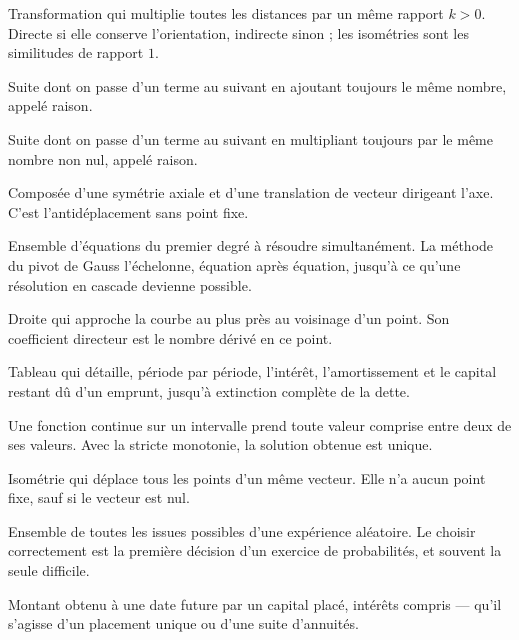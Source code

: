 Transformation qui multiplie toutes les distances par un même rapport $k>0$.
Directe si elle conserve l'orientation, indirecte sinon ; les isométries sont
les similitudes de rapport $1$.

Suite dont on passe d'un terme au suivant en ajoutant toujours le même nombre,
appelé raison.

Suite dont on passe d'un terme au suivant en multipliant toujours par le même
nombre non nul, appelé raison.

Composée d'une symétrie axiale et d'une translation de vecteur dirigeant
l'axe. C'est l'antidéplacement sans point fixe.

Ensemble d'équations du premier degré à résoudre simultanément. La méthode
du pivot de Gauss l'échelonne, équation après équation, jusqu'à ce qu'une
résolution en cascade devienne possible.


Droite qui approche la courbe au plus près au voisinage d'un point. Son
coefficient directeur est le nombre dérivé en ce point.

Tableau qui détaille, période par période, l'intérêt, l'amortissement et le
capital restant dû d'un emprunt, jusqu'à extinction complète de la dette.

Une fonction continue sur un intervalle prend toute valeur comprise entre deux
de ses valeurs. Avec la stricte monotonie, la solution obtenue est unique.

Isométrie qui déplace tous les points d'un même vecteur. Elle n'a aucun point
fixe, sauf si le vecteur est nul.


Ensemble de toutes les issues possibles d'une expérience aléatoire. Le choisir
correctement est la première décision d'un exercice de probabilités, et
souvent la seule difficile.


Montant obtenu à une date future par un capital placé, intérêts compris —
qu'il s'agisse d'un placement unique ou d'une suite d'annuités.

